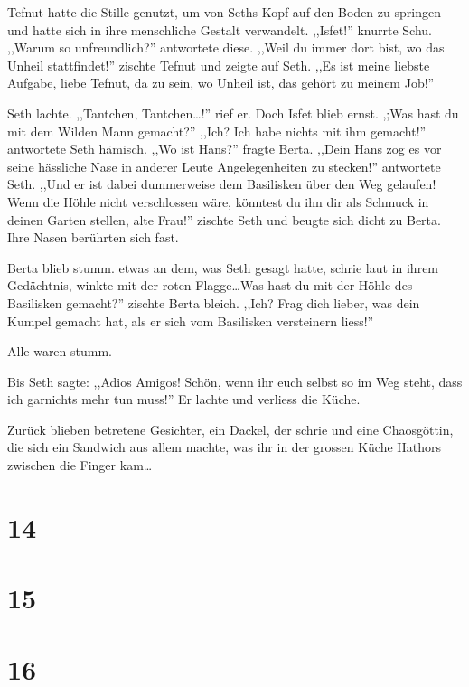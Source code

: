Tefnut hatte die Stille genutzt, um von Seths Kopf auf den Boden zu springen und hatte sich in ihre menschliche Gestalt verwandelt. ,,Isfet!'' knurrte Schu. ,,Warum so unfreundlich?'' antwortete diese. ,,Weil du immer dort bist, wo das Unheil stattfindet!'' zischte Tefnut und zeigte auf Seth. ,,Es ist meine liebste Aufgabe, liebe Tefnut, da zu sein, wo Unheil ist, das gehört zu meinem Job!''

Seth lachte. ,,Tantchen, Tantchen\dots !'' rief er. Doch Isfet blieb ernst. ,;Was hast du mit dem Wilden Mann gemacht?'' ,,Ich? Ich habe nichts mit ihm gemacht!'' antwortete Seth hämisch. ,,Wo ist Hans?'' fragte Berta. ,,Dein Hans zog es vor seine hässliche Nase in anderer Leute Angelegenheiten zu stecken!'' antwortete Seth. ,,Und er ist dabei dummerweise dem Basilisken über den Weg gelaufen! Wenn die Höhle nicht verschlossen wäre, könntest du ihn dir als Schmuck in deinen Garten stellen, alte Frau!'' zischte Seth und beugte sich dicht zu Berta. Ihre Nasen berührten sich fast. 

Berta blieb stumm. etwas an dem, was Seth gesagt hatte, schrie laut in ihrem Gedächtnis, winkte mit der roten Flagge\dots Was hast du mit der Höhle des Basilisken gemacht?'' zischte Berta bleich. ,,Ich? Frag dich lieber, was dein Kumpel gemacht hat, als er sich vom Basilisken versteinern liess!''

Alle waren stumm. 

Bis Seth sagte: ,,Adios Amigos! Schön, wenn ihr euch selbst so im Weg steht, dass ich garnichts mehr tun muss!'' Er lachte und verliess die Küche.

Zurück blieben betretene Gesichter, ein Dackel, der schrie und eine Chaosgöttin, die sich ein Sandwich aus allem machte, was ihr in der grossen Küche Hathors zwischen die Finger kam\dots

\section*{14}

\section*{15}

\section*{16}



